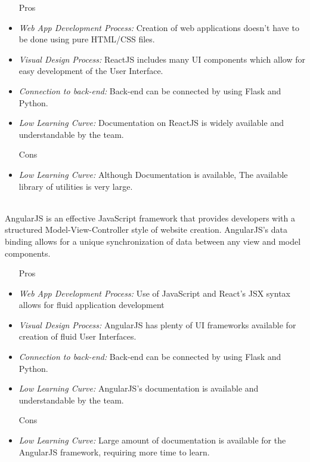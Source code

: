 \documentclass[12pt,journal,compsoc]{IEEEtran}
\newenvironment{subs}
  {\adjustwidth{1em}{0pt}}
  {\endadjustwidth}
\begin{document}
\begin{subs}
\begin{subs}
\begin{subs}
\begin{subs}
\begin{itemize}
    \item [{Pros}]
    \item \emph{Web App Development Process:} Creation of web applications doesn’t have to be done using pure HTML/CSS files.
    \item \emph{Visual Design Process:} ReactJS includes many UI components which allow for easy development of the User Interface. 
    \item \emph{Connection to back-end:} Back-end can be connected by using Flask and Python.
    \item \emph{Low Learning Curve:} Documentation on ReactJS is widely available and understandable by the team.
    \item [{Cons}]
    \item \emph{Low Learning Curve:} Although Documentation is available, The available library of utilities is very large.
\end{itemize}
\end{subs}

\\
AngularJS is an effective JavaScript framework that provides developers with a structured Model-View-Controller style of website creation. AngularJS’s data binding allows for a unique synchronization of data between any view and model components. 

\begin{subs}
\begin{itemize}
    \item [{Pros}]
    \item \emph{Web App Development Process:}  Use of JavaScript and React’s JSX syntax allows for fluid application development
    \item \emph{Visual Design Process:} AngularJS has plenty of UI frameworks available for creation of fluid User Interfaces.
    \item \emph{Connection to back-end:} Back-end can be connected by using Flask and Python.
    \item \emph{Low Learning Curve:} AngularJS’s documentation is available and understandable by the team.
    \item [{Cons}]
    \item \emph{Low Learning Curve:} Large amount of documentation is available for the AngularJS framework, requiring more time to learn.
\end{itemize}
\end{subs}


\end{subs}
\end{subs}
\end{subs}
\end{document}
